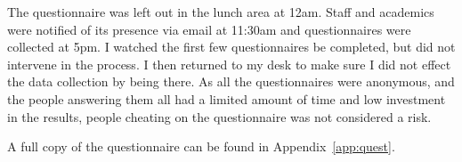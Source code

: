 The questionnaire was left out in the lunch area at 12am. Staff and academics were notified of its presence via email at 11:30am and questionnaires were collected at 5pm. I watched the first few questionnaires be completed, but did not intervene in the process. I then returned to my desk to make sure I did not effect the data collection by being there. As all the questionnaires were anonymous, and the people answering them all had a limited amount of time and low investment in the results, people cheating on the questionnaire was not considered a risk. 

A full copy of the questionnaire can be found in Appendix~\ref{app:quest}.

